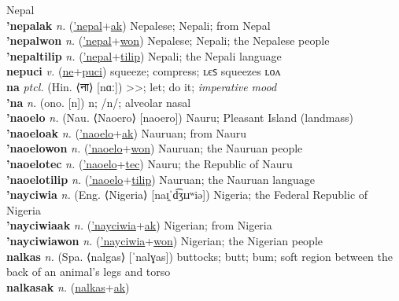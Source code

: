 Nepal \label{'nepal} \\
\textbf{'nepalak} \textit{n.} (\hyperref['nepal]{'nepal}+\hyperref[ak]{ak})
Nepalese; Nepali; from Nepal \label{'nepalak} \\
\textbf{'nepalwon} \textit{n.} (\hyperref['nepal]{'nepal}+\hyperref[won]{won})
Nepalese; Nepali; the Nepalese people \label{'nepalwon} \\
\textbf{'nepaltilip} \textit{n.} (\hyperref['nepal]{'nepal}+\hyperref[tilip]{tilip})
Nepali; the Nepali language \label{'nepaltilip} \\
\textbf{nepuci} \textit{v.} (\hyperref[ne]{ne}+\hyperref[puci]{puci})
squeeze; compress; ʟєꜱ squeezes ʟᴏᴧ \label{nepuci} \\
\textbf{na} \textit{ptcl.} (Hin. ⟨ना⟩ [nɑː])
>>; let; do it; \textit{imperative mood} \label{na} \\
\textbf{'na} \textit{n.} (ono. [n])
n; /n/; alveolar nasal \label{'na} \\
\textbf{'naoelo} \textit{n.} (Nau. ⟨Naoero⟩ [naoero])
Nauru; Pleasant Island (landmass) \label{'naoelo} \\
\textbf{'naoeloak} \textit{n.} (\hyperref['naoelo]{'naoelo}+\hyperref[ak]{ak})
Nauruan; from Nauru \label{'naoeloak} \\
\textbf{'naoelowon} \textit{n.} (\hyperref['naoelo]{'naoelo}+\hyperref[won]{won})
Nauruan; the Nauruan people \label{'naoelowon} \\
\textbf{'naoelotec} \textit{n.} (\hyperref['naoelo]{'naoelo}+\hyperref[tec]{tec})
Nauru; the Republic of Nauru \label{'naoelotec} \\
\textbf{'naoelotilip} \textit{n.} (\hyperref['naoelo]{'naoelo}+\hyperref[tilip]{tilip})
Nauruan; the Nauruan language \label{'naoelotilip} \\
\textbf{'nayciwia} \textit{n.} (Eng. ⟨Nigeria⟩ [naɪ̯ˈd͡ʒɪɹʷiə])
Nigeria; the Federal Republic of Nigeria \label{'nayciwia} \\
\textbf{'nayciwiaak} \textit{n.} (\hyperref['nayciwia]{'nayciwia}+\hyperref[ak]{ak})
Nigerian; from Nigeria \label{'nayciwiaak} \\
\textbf{'nayciwiawon} \textit{n.} (\hyperref['nayciwia]{'nayciwia}+\hyperref[won]{won})
Nigerian; the Nigerian people \label{'nayciwiawon} \\
\textbf{nalkas} \textit{n.} (Spa. ⟨nalgas⟩ [ˈnalɣas])
buttocks; butt; bum; soft region between the back of an animal’s legs and torso \label{nalkas} \\
\textbf{nalkasak} \textit{n.} (\hyperref[nalkas]{nalkas}+\hyperref[ak]{ak})
